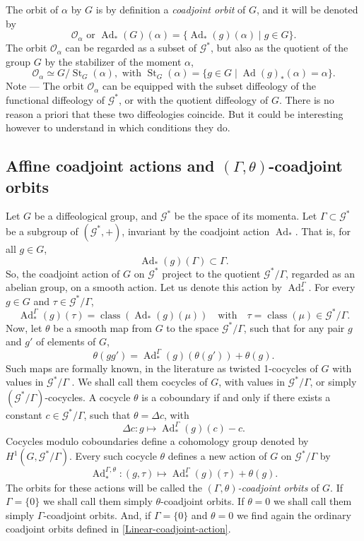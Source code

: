 \documentclass[10pt,reqno,twoside]{amsart}
\newcommand{\qmbox}[1]{\quad\mbox{#1}\quad}
\newcommand{\cG}{\mathcal{G}}
\newcommand{\cO}{\mathcal{O}}
\DeclareMathOperator{\Stab}{St}
\DeclareMathOperator{\Ad}{Ad}
\DeclareMathOperator{\class}{class}
\theoremstyle{plain}
\theoremstyle{definition}
\newcommand{\article}[1]{\subsection{#1}}
\begin{document}
  The orbit of $\alpha$ by $G$ is by definition a {\em coadjoint orbit\/} of $G$,
  and it will be denoted by
  $$
    \cO_\alpha \mbox{ or } \Ad_*(G)(\alpha) = \{ \Ad_*(g)(\alpha) \mid g\in G \}.
    $$
  The orbit $\cO_\alpha$ can be regarded as a subset of $\cG^*$,
  but also as the quotient of the group $G$ by the stabilizer of the moment $\alpha$,
  $$
    \cO_\alpha \simeq G/\Stab_{G}(\alpha), \mbox{ with }
    \Stab_{G}(\alpha) = \{ g \in G \mid \Ad(g)_*(\alpha) = \alpha \}.
    $$
  {\sc Note} --- The orbit $\cO_\alpha$ can be equipped with the subset diffeology of the functional diffeology of $\cG^*$,
  or with the quotient diffeology of $G$.
  There is no reason a priori that these two diffeologies coincide.
  But it could be interesting however to understand in which conditions they do.
  
  \article{Affine coadjoint actions and $(\Gamma,\theta)$-coadjoint orbits}
  \label{Affine-coadjoint-actions-and-orbits}
  Let $G$ be a diffeological group,
  and $\cG^*$ be the space of its momenta.
  Let $\Gamma \subset \cG^*$ be a subgroup of $(\cG^*,+)$,
  invariant by the coadjoint action $\Ad_*$.
  That is,
  for all $g \in G$,
  $$
    \Ad_*(g)(\Gamma) \subset \Gamma.
    $$
  So,
  the coadjoint action of $G$ on $\cG^*$ project to the quotient $\cG^*\!/\Gamma$,
  regarded as an abelian group,
  on a smooth action.
  Let us denote this action by $\Ad_*^\Gamma$.
  For every $g \in G$ and $\tau \in \cG^*\!/\Gamma$,
  $$
    \Ad_*^\Gamma(g)(\tau) = \class(\Ad_*(g)(\mu))
    \qmbox{with} \tau = \class(\mu) \in \cG^*\!/\Gamma.
    $$
  Now,
  let $\theta$ be a smooth map from $G$ to the space $\cG^*\!/\Gamma$,
  such that for any pair $g$ and $g'$ of elements of $G$,
  $$
    \theta(g g') = \Ad_*^\Gamma(g)(\theta(g')) + \theta(g).
    $$
  Such maps are formally known,
  in the literature as twisted 1-cocycles of $G$ with values in $\cG^*\!/\Gamma$ \cite{Kir74}.
  We shall call them cocycles of $G$,
  with values in $\cG^*\!/\Gamma$,
  or simply $(\cG^*\!/\Gamma)$-cocycles.
  A cocycle $\theta$ is a coboundary if and only if there exists a constant $c \in \cG^*\!/\Gamma$,
  such that $\theta = \Delta c$,
  with
  $$
    \Delta c : g \mapsto \Ad_*^\Gamma(g)(c) -c.
    $$
  Cocycles modulo coboundaries define a cohomology group denoted by $H^1(G,\cG^*\!/\Gamma)$.
  Every such cocycle $\theta$ defines a new action of $G$ on $\cG^*\!/\Gamma$ by
  $$
    \Ad^{\Gamma,\theta}_* : (g, \tau) \mapsto \Ad_*^\Gamma(g)(\tau) + \theta(g).
    $$
  The orbits for these actions will be called the {\em $(\Gamma,\theta)$-coadjoint orbits} of $G$.
  If $\Gamma = \{0\}$ we shall call them simply $\theta$-coadjoint orbits.
  If $\theta = 0$ we shall call them simply $\Gamma$-coadjoint orbits.
  And,
  if $\Gamma = \{0\}$ and $\theta = 0$ we find again the ordinary coadjoint orbits defined in \ref{Linear-coadjoint-action}.
  
\end{document}
